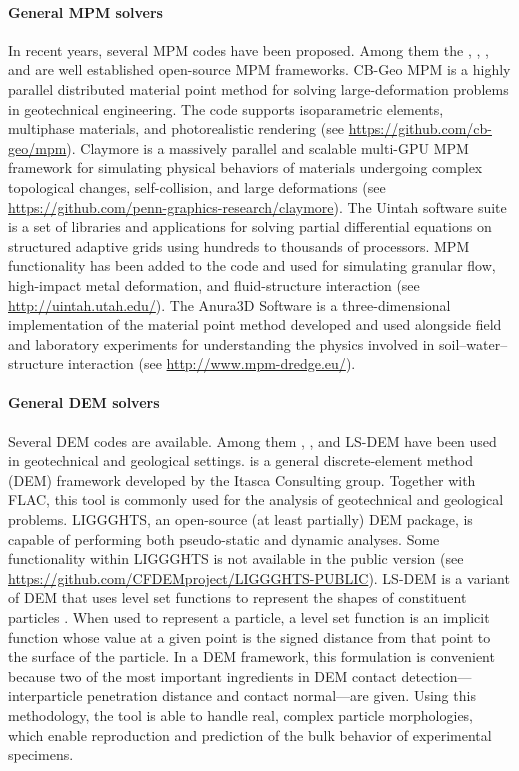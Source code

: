 \paragraph{General MPM solvers}
In recent years, several MPM codes have been proposed. Among them the , , , and  are well established open-source MPM frameworks. CB-Geo MPM is a highly parallel distributed material point method for solving large-deformation problems in geotechnical engineering. The code supports isoparametric elements, multiphase materials, and photorealistic rendering (see 
\url{https://github.com/cb-geo/mpm}). Claymore is a massively parallel and scalable multi-GPU MPM framework for simulating physical behaviors of materials undergoing complex topological changes, self-collision, and large deformations (see \url{https://github.com/penn-graphics-research/claymore}). The Uintah software suite is a set of libraries and applications for solving partial differential equations on structured adaptive grids using hundreds to thousands of processors. MPM functionality has been added to the code and used for simulating granular flow, high-impact metal deformation, and fluid-structure interaction (see \url{http://uintah.utah.edu/}). The Anura3D Software is a three-dimensional implementation of the material point method developed and used alongside field and laboratory experiments for understanding the physics involved in soil--water--structure interaction (see \url{http://www.mpm-dredge.eu/}).

\paragraph{General DEM solvers}
Several DEM codes are available. Among them , , and LS-DEM have been used in geotechnical and geological settings.
 is a general discrete-element method (DEM) framework developed by the Itasca Consulting group. Together with FLAC, this tool is commonly used for the analysis of geotechnical and geological problems.
LIGGGHTS, an open-source (at least partially) DEM package, is capable of performing both pseudo-static and dynamic analyses. Some functionality within LIGGGHTS is not available in the public version (see \url{https://github.com/CFDEMproject/LIGGGHTS-PUBLIC}). LS-DEM is a variant of DEM that uses level set functions to represent the shapes of constituent particles \citep{kawamoto2018}. When used to represent a particle, a level set function is an implicit function whose value at a given point is the signed distance from that point to the surface of the particle. In a DEM framework, this formulation is convenient because two of the most important ingredients in DEM contact detection---interparticle penetration distance and contact normal---are given. Using this methodology, the tool is able to handle real, complex particle morphologies, which enable reproduction and prediction of the bulk behavior of experimental specimens.

